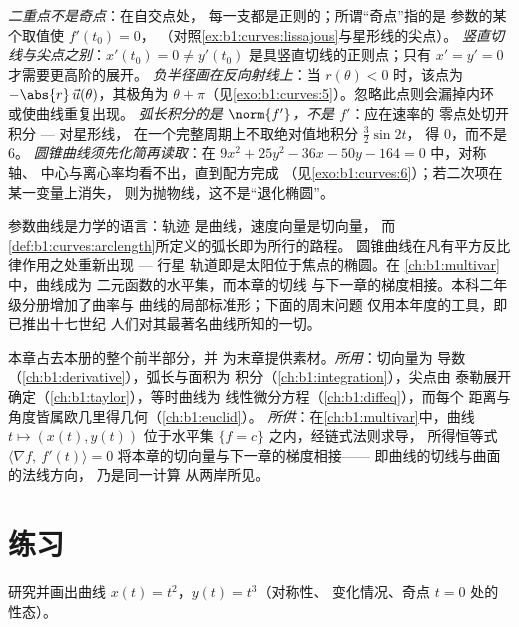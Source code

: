 \begin{remark}[常见陷阱]
\label{rem:b1:curves:pitfalls}
\emph{二重点不是奇点}：在自交点处，
每一支都是正则的；所谓“奇点”指的是
参数的某个取值使 $f'(t_0) = 0$，
（对照\cref{ex:b1:curves:lissajous}与星形线的尖点）。
\emph{竖直切线与尖点之别}：$x'(t_0) = 0 \neq y'(t_0)$
是具竖直切线的正则点；只有 $x' = y' = 0$
才需要更高阶的展开。
\emph{负半径画在反向射线上}：当 $r(\theta) <
0$ 时，该点为 $-\abs{r}\,\vec u(\theta)$，其极角为 $\theta +
\pi$（见\cref{exo:b1:curves:5}）。忽略此点则会漏掉内环
或使曲线重复出现。
\emph{弧长积分的是 $\norm{f'}$，不是 $f'$}：应在速率的
零点处切开积分 --- 对星形线，
在一个完整周期上不取绝对值地积分 $\frac32\sin 2t$，
得 $0$，而不是 $6$。
\emph{圆锥曲线须先化简再读取}：在 $9x^2 +
25y^2 - 36x - 50y - 164 = 0$ 中，对称轴、
中心与离心率均看不出，直到配方完成
（见\cref{exo:b1:curves:6}）；若二次项在某一变量上消失，
则为抛物线，这不是“退化椭圆”。
\end{remark}

\begin{remark}[这些曲线的用途]
\label{rem:b1:curves:whereused}
参数曲线是力学的语言：轨迹
是曲线，速度向量是切向量，
而\cref{def:b1:curves:arclength}所定义的弧长即为所行的路程。
圆锥曲线在凡有平方反比律作用之处重新出现 --- 行星
轨道即是太阳位于焦点的椭圆。在
\cref{ch:b1:multivar}中，曲线成为
二元函数的水平集，而本章的切线
与下一章的梯度相接。本科二年级分册增加了曲率与
曲线的局部标准形；下面的周末问题
仅用本年度的工具，即已推出十七世纪
人们对其最著名曲线所知的一切。
\end{remark}

\begin{remark}[第 3 册内的几种视角]
\label{rem:b1:curves:perspectives}
本章占去本册的整个前半部分，并
为末章提供素材。\emph{所用}：切向量为
导数（\cref{ch:b1:derivative}），弧长与面积为
积分（\cref{ch:b1:integration}），尖点由
泰勒展开确定（\cref{ch:b1:taylor}），等时曲线为
线性微分方程（\cref{ch:b1:diffeq}），而每个
距离与角度皆属欧几里得几何（\cref{ch:b1:euclid}）。
\emph{所供}：在\cref{ch:b1:multivar}中，曲线 $t \mapsto (x(t),
y(t))$ 位于水平集 $\{f = c\}$ 之内，经链式法则求导，
所得恒等式 $\langle \nabla f,\
f'(t)\rangle = 0$ 将本章的切向量与下一章的梯度相接——
即曲线的切线与曲面的法线方向，
乃是同一计算
从两岸所见。
\end{remark}

\section{练习}

\begin{exercise}[$\star$]\label{exo:b1:curves:1}
研究并画出曲线 $x(t) = t^2$，$y(t) = t^3$（对称性、
变化情况、奇点 $t = 0$ 处的性态）。
\end{exercise}

